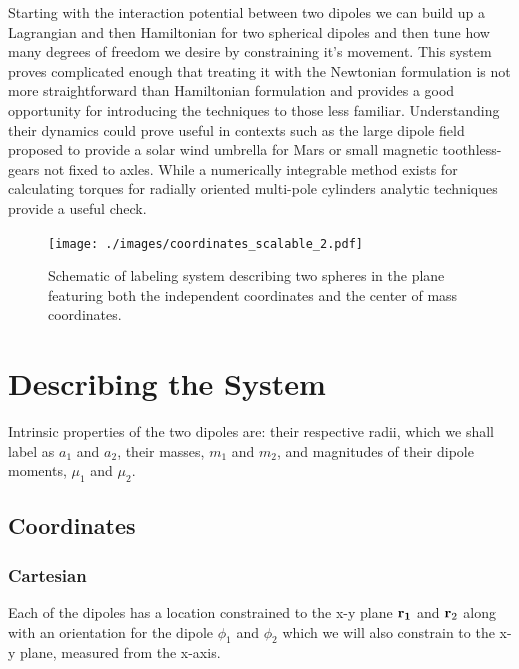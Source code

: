 \documentclass[prbg,preprint]{revtex4-1}
\newcommand{\cvec}[1]{{\rm{\bf{#1}}}}
\begin{document}
Starting with the interaction potential between two dipoles we can build up a Lagrangian and then Hamiltonian for two spherical dipoles and then tune how many degrees of freedom we desire by constraining it's movement. This system proves complicated enough that treating it with the Newtonian formulation is not more straightforward than Hamiltonian formulation and provides a good opportunity for introducing the techniques to those less familiar.
Understanding their dynamics could prove useful in contexts such as the large dipole field proposed to provide a solar wind umbrella for Mars \cite{2017LPICo1989.8250G} or small magnetic toothless-gears \cite{doi:10.1119/1.5029823} not fixed to axles.
While a numerically integrable method exists for calculating torques for radially oriented multi-pole cylinders \cite{Furlani:1995aa}  analytic techniques provide a useful check.

\begin{figure}[h]
  \centering
  \texttt{[image: ./images/coordinates\_scalable\_2.pdf]}
  \caption{Schematic of labeling system describing two spheres in the plane featuring both the independent coordinates and the center of mass coordinates.}
\end{figure}


\section{Describing the System}
Intrinsic properties of the two dipoles are: their respective radii, which we shall label as $a_1$ and $a_2$, their masses, $m_1$ and $m_2$, and magnitudes of their dipole moments, $\mu_1$ and $\mu_2$.
\subsection{Coordinates}
\subsubsection{Cartesian}

Each of the dipoles has a location constrained to the x-y plane $\cvec{r_1}$ and $\cvec r_2$ along with an orientation for the dipole $\phi_1$ and $\phi_2$ which we will also constrain to the x-y plane, measured from the x-axis.
\end{document}
